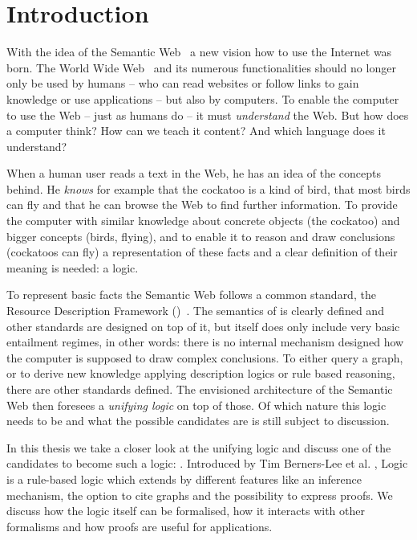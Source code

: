 \chapter{Introduction}
\setlength{\epigraphrule}{0pt}
\setlength{\epigraphwidth}{0.75\textwidth}

With the idea of the Semantic Web~\cite{SemanticWeb} a new vision how to use the Internet was born. The World Wide
Web~\cite{bernerslee_1992} and its numerous functionalities should no longer only be used by humans -- 
who can read websites or follow links to gain knowledge or use applications -- but also by computers. To enable the computer to use the Web -- just as humans do -- 
it must \emph{understand} the Web. But how does a computer think? How can we teach it content? 
And which language does it understand? 

When a human user reads a text in the Web, he has an idea of the concepts behind. He \emph{knows} for example that the cockatoo is a kind of bird, that most birds can fly 
and that he
can browse the Web to find further information. To provide the computer with similar knowledge about concrete objects (the cockatoo) and bigger concepts (birds, flying),
and to enable it to reason and draw conclusions (cockatoos can fly) a representation of these facts and a clear definition of their meaning is needed: a logic.

To represent basic facts the Semantic Web follows a common standard, the Resource Description Framework (\rdf)~\cite{rdf}. 
The semantics of \rdf is clearly defined and other standards are designed on top of it, 
but \rdf itself does only include very basic entailment regimes, in other words: there is no internal
mechanism designed how the computer is supposed to draw complex conclusions.
To either query a graph, or to derive new knowledge applying description logics
or rule based reasoning, there are other standards defined. The envisioned architecture of the Semantic Web then 
foresees a \emph{unifying logic} on top of those. 
Of which nature this logic needs to be and what the possible candidates are is still subject to discussion. 

In this thesis we take a closer look at the unifying logic and 
discuss one of the candidates to become such a logic: 
\notationthree. 
Introduced by Tim Berners-Lee et al. \cite{N3Logic}, \notationthree Logic is a rule-based logic which extends \rdf
by different features like an inference mechanism, the option to cite graphs and the possibility to express proofs.
We discuss how the logic itself can be formalised, how it interacts with other formalisms and how proofs are useful for applications.



